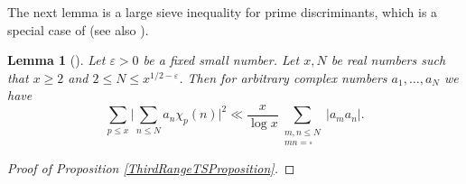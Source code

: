 \documentclass[10pt]{amsart}
\theoremstyle{plain}
\newtheorem{lem}[thm]{Lemma}
\theoremstyle{definition}
\let\ep\varepsilon
\begin{document}
The next lemma is a large sieve inequality for prime discriminants, which is a special case of \cite[Lem.\,9]{MoVa79} (see also \cite[Lem.\,1]{BaMo}).

\begin{lem} [{\cite[Lem.\,9]{MoVa79}}]\label{LargeSieveMV}
Let $\ep>0$ be a fixed small number. Let $x, N$ be real numbers such that $x\geq 2$ and $2\leq N\leq x^{1/2-\ep}$. Then for arbitrary complex numbers $a_1, \dots, a_N$ we have\vspace*{-3pt}
\[
\sum_{p\le x} \biggl|\sum_{n\leq N} a_n \chi_p(n)\biggr|^2 \ll \frac{x}{\log x} \sum_{\substack{m, n \leq N\\ mn= \square}} |a_ma_n|.
\]
\end{lem}

\begin{proof}[Proof of Proposition \ref{ThirdRangeTSProposition}]


\end{proof}
\end{document}
